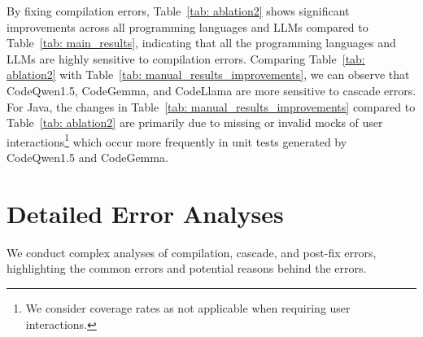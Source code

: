 By fixing compilation errors, Table~\ref{tab: ablation2} shows significant improvements across all programming languages and LLMs compared to Table~\ref{tab: main_results}, indicating that all the programming languages and LLMs are highly sensitive to compilation errors.
Comparing Table~\ref{tab: ablation2} with Table~\ref{tab: manual_results_improvements}, we can observe that CodeQwen1.5, CodeGemma, and CodeLlama are more sensitive to cascade errors.
For Java, the changes in Table~\ref{tab: manual_results_improvements} compared to Table~\ref{tab: ablation2} are primarily due to missing or invalid mocks of user interactions\footnote{We consider coverage rates as not applicable when requiring user interactions.} which occur more frequently in unit tests generated by CodeQwen1.5 and CodeGemma. 


\section{Detailed Error Analyses}
\label{sec: full_error_analyses}
We conduct complex analyses of compilation, cascade, and post-fix errors, highlighting the common errors and potential reasons behind the errors.

